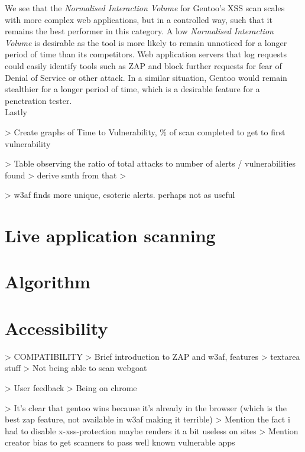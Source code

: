  We see that the \textit{Normalised Interaction Volume} for Gentoo's XSS scan scales with more complex web applications, but in a controlled way, such that it remains the best performer in this category. A low \textit{Normalised Interaction Volume} is desirable as the tool is more likely to remain unnoticed for a longer period of time than its competitors. Web application servers that log requests could easily identify tools such as ZAP and block further requests for fear of Denial of Service or other attack. In a similar situation, Gentoo would remain stealthier for a longer period of time, which is a desirable feature for a penetration tester. \\ 

Lastly 

> Create graphs of Time to Vulnerability, \% of scan completed to get to first vulnerability 

> Table observing the ratio of total attacks to number of alerts / vulnerabilities found
	> derive smth from that
> 

> w3af finds more unique, esoteric alerts. perhaps not as useful


\section{Live application scanning}

\section{Algorithm}

\section{Accessibility}
> COMPATIBILITY 
	> Brief introduction to ZAP and w3af, features
	> textarea stuff	
	> Not being able to scan webgoat


> User feedback
> Being on chrome

> It's clear that gentoo wins because it's already in the browser (which is the best zap feature, not available in w3af making it terrible) 
> Mention the fact i had to disable x-xss-protection maybe renders it a bit useless on sites
> Mention creator bias to get scanners to pass well known vulnerable apps



































